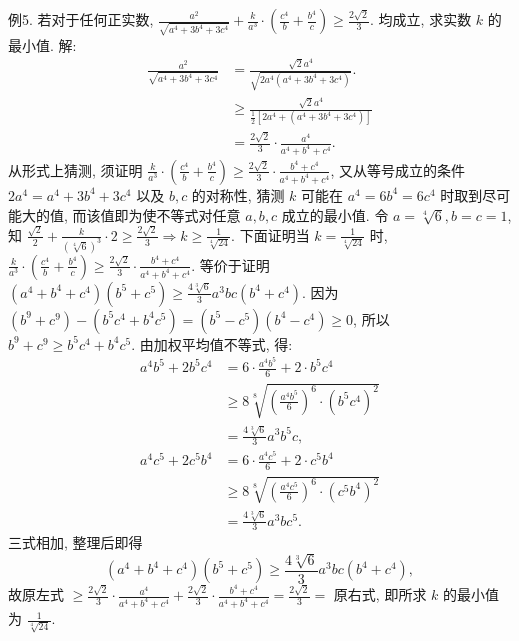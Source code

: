 例5. 若对于任何正实数, $\frac{a^2}{\sqrt{a^4+3 b^4+3 c^4}}+\frac{k}{a^3} \cdot\left(\frac{c^4}{b}+\frac{b^4}{c}\right) \geqslant \frac{2 \sqrt{2}}{3}$. 均成立, 求实数 $k$ 的最小值.
解:$$
\begin{aligned}
\frac{a^2}{\sqrt{a^4+3 b^4+3 c^4}} & =\frac{\sqrt{2} a^4}{\sqrt{2 a^4\left(a^4+3 b^4+3 c^4\right)}} . \\
& \geqslant \frac{\sqrt{2} a^4}{\frac{1}{2}\left[2 a^4+\left(a^4+3 b^4+3 c^4\right)\right]} \\
& =\frac{2 \sqrt{2}}{3} \cdot \frac{a^4}{a^4+b^4+c^4} .
\end{aligned}
$$
从形式上猜测, 须证明 $\frac{k}{a^3} \cdot\left(\frac{c^4}{b}+\frac{b^4}{c}\right) \geqslant \frac{2 \sqrt{2}}{3} \cdot \frac{b^4+c^4}{a^4+b^4+c^4}$, 又从等号成立的条件 $2 a^4=a^4+3 b^4+3 c^4$ 以及 $b, c$ 的对称性, 猜测 $k$ 可能在 $a^4=6 b^4= 6 c^4$ 时取到尽可能大的值, 而该值即为使不等式对任意 $a, b, c$ 成立的最小值.
令 $a=\sqrt[4]{6}, b=c=1$, 知 $\frac{\sqrt{2}}{2}+\frac{k}{(\sqrt[4]{6})^3} \cdot 2 \geqslant \frac{2 \sqrt{2}}{3} \Rightarrow k \geqslant \frac{1}{\sqrt[4]{24}}$.
下面证明当 $k=\frac{1}{\sqrt[4]{24}}$ 时, $\frac{k}{a^3} \cdot\left(\frac{c^4}{b}+\frac{b^4}{c}\right) \geqslant \frac{2 \sqrt{2}}{3} \cdot \frac{b^4+c^4}{a^4+b^4+c^4}$.
等价于证明 $\left(a^4+b^4+c^4\right)\left(b^5+c^5\right) \geqslant \frac{4 \sqrt[3]{6}}{3} a^3 b c\left(b^4+c^4\right)$.
因为 $\left(b^9+c^9\right)-\left(b^5 c^4+b^4 c^5\right)=\left(b^5-c^5\right)\left(b^4-c^4\right) \geqslant 0$, 所以 $b^9+c^9 \geqslant b^5 c^4+b^4 c^5$.
由加权平均值不等式, 得:
$$
\begin{aligned}
a^4 b^5+2 b^5 c^4 & =6 \cdot \frac{a^4 b^5}{6}+2 \cdot b^5 c^4 \\
& \geqslant 8 \sqrt[8]{\left(\frac{a^4 b^5}{6}\right)^6 \cdot\left(b^5 c^4\right)^2} \\
& =\frac{4 \sqrt[3]{6}}{3} a^3 b^5 c, \\
a^4 c^5+2 c^5 b^4 & =6 \cdot \frac{a^4 c^5}{6}+2 \cdot c^5 b^4 \\
& \geqslant 8 \sqrt[8]{\left(\frac{a^4 c^5}{6}\right)^6 \cdot\left(c^5 b^4\right)^2} \\
& =\frac{4 \sqrt[3]{6}}{3} a^3 b c^5 .
\end{aligned}
$$
三式相加, 整理后即得
$$
\left(a^4+b^4+c^4\right)\left(b^5+c^5\right) \geqslant \frac{4 \sqrt[3]{6}}{3} a^3 b c\left(b^4+c^4\right),
$$
故原左式 $\geqslant \frac{2 \sqrt{2}}{3} \cdot \frac{a^4}{a^4+b^4+c^4}+\frac{2 \sqrt{2}}{3} \cdot \frac{b^4+c^4}{a^4+b^4+c^4}=\frac{2 \sqrt{2}}{3}=$ 原右式, 即所求 $k$ 的最小值为 $\frac{1}{\sqrt[4]{24}}$.



